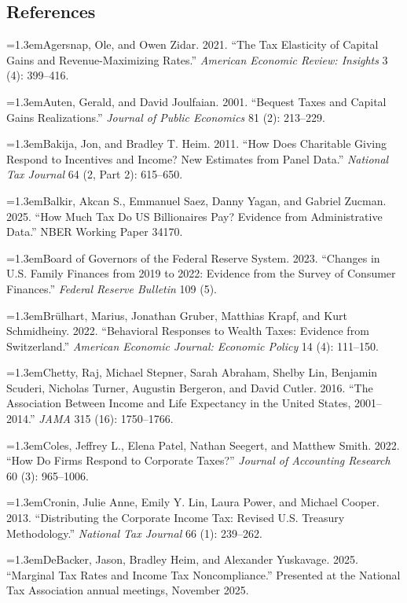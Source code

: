 \documentclass[10pt,twocolumn]{article}
\newcommand{\bibentry}{\par\hangindent=1.3em\noindent}
\begin{document}
\subsection*{References}

{\small
\bibentry Agersnap, Ole, and Owen Zidar. 2021. ``The Tax Elasticity of
Capital Gains and Revenue-Maximizing Rates.'' \emph{American Economic Review:
Insights} 3 (4): 399--416.

\bibentry Auten, Gerald, and David Joulfaian. 2001. ``Bequest Taxes and
Capital Gains Realizations.'' \emph{Journal of Public Economics} 81 (2):
213--229.

\bibentry Bakija, Jon, and Bradley T. Heim. 2011. ``How Does Charitable
Giving Respond to Incentives and Income? New Estimates from Panel Data.''
\emph{National Tax Journal} 64 (2, Part 2): 615--650.

\bibentry Balkir, Akcan S., Emmanuel Saez, Danny Yagan, and Gabriel Zucman.
2025. ``How Much Tax Do US Billionaires Pay? Evidence from Administrative
Data.'' NBER Working Paper 34170.

\bibentry Board of Governors of the Federal Reserve System. 2023. ``Changes
in U.S. Family Finances from 2019 to 2022: Evidence from the Survey of
Consumer Finances.'' \emph{Federal Reserve Bulletin} 109 (5).

\bibentry Br\"ulhart, Marius, Jonathan Gruber, Matthias Krapf, and Kurt
Schmidheiny. 2022. ``Behavioral Responses to Wealth Taxes: Evidence from
Switzerland.'' \emph{American Economic Journal: Economic Policy} 14 (4):
111--150.

\bibentry Chetty, Raj, Michael Stepner, Sarah Abraham, Shelby Lin, Benjamin
Scuderi, Nicholas Turner, Augustin Bergeron, and David Cutler. 2016. ``The
Association Between Income and Life Expectancy in the United States,
2001--2014.'' \emph{JAMA} 315 (16): 1750--1766.

\bibentry Coles, Jeffrey L., Elena Patel, Nathan Seegert, and Matthew Smith.
2022. ``How Do Firms Respond to Corporate Taxes?'' \emph{Journal of
Accounting Research} 60 (3): 965--1006.

\bibentry Cronin, Julie Anne, Emily Y. Lin, Laura Power, and Michael Cooper.
2013. ``Distributing the Corporate Income Tax: Revised U.S. Treasury
Methodology.'' \emph{National Tax Journal} 66 (1): 239--262.

\bibentry DeBacker, Jason, Bradley Heim, and Alexander Yuskavage. 2025.
``Marginal Tax Rates and Income Tax Noncompliance.'' Presented at the
National Tax Association annual meetings, November 2025.

}
\end{document}
